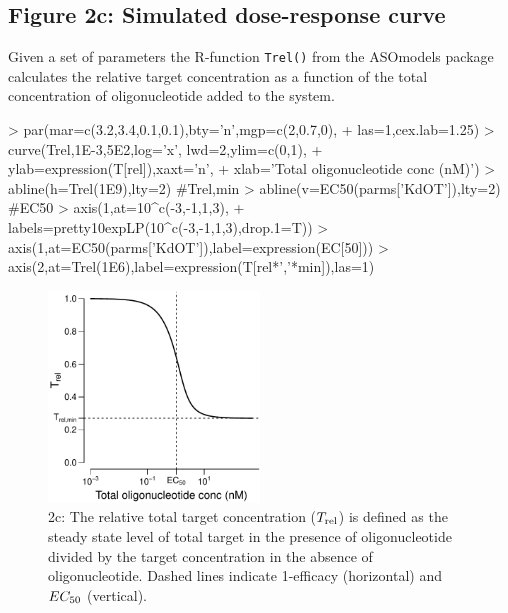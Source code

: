 \documentclass{article}
\newenvironment{Ncenter}{%
  \setlength\topsep{-10pt}
  \setlength\parskip{-100pt}
  \begin{center}
}{%
  \end{center}
}
\newcommand{\Trel}{T_{\rm{rel}}}
\newcommand{\EC}{EC_{\rm{50}}}
\begin{document}
\subsection*{Figure 2c: Simulated dose-response curve}
Given a set of parameters the R-function \texttt{Trel()} from the ASOmodels package calculates the relative target concentration as a function of the total concentration of oligonucleotide added to the system.
\begin{Schunk}
\begin{Sinput}
> par(mar=c(3.2,3.4,0.1,0.1),bty='n',mgp=c(2,0.7,0),
+     las=1,cex.lab=1.25)
> curve(Trel,1E-3,5E2,log='x', lwd=2,ylim=c(0,1),
+       ylab=expression(T[rel]),xaxt='n',
+       xlab='Total oligonucleotide conc (nM)')
> abline(h=Trel(1E9),lty=2) #Trel,min
> abline(v=EC50(parms['KdOT']),lty=2) #EC50
> axis(1,at=10^c(-3,-1,1,3),
+      labels=pretty10expLP(10^c(-3,-1,1,3),drop.1=T))
> axis(1,at=EC50(parms['KdOT']),label=expression(EC[50]))
> axis(2,at=Trel(1E6),label=expression(T[rel*','*min]),las=1)
\end{Sinput}
\end{Schunk}
\begin{figure}[!h]
\begin{Ncenter}
\includegraphics[width=0.5\textwidth]{Vignette2-Figc}
\end{Ncenter}
\caption{2c: The relative total target concentration ($\Trel$) is defined as the steady state level of total target in the presence of oligonucleotide divided by the target concentration in the absence of oligonucleotide. Dashed lines indicate 1-efficacy (horizontal) and $\EC$ (vertical).}
\end{figure}

\end{document}
